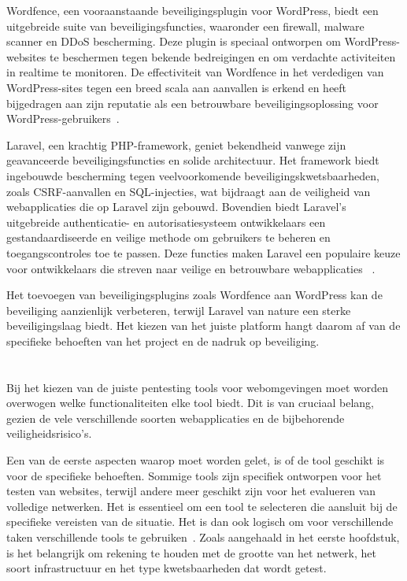 Wordfence, een vooraanstaande beveiligingsplugin voor WordPress, biedt een uitgebreide suite van beveiligingsfuncties, waaronder een 
firewall, malware scanner en DDoS bescherming. Deze plugin is speciaal ontworpen om WordPress-websites te beschermen tegen bekende 
bedreigingen en om verdachte activiteiten in realtime te monitoren. De effectiviteit van Wordfence in het verdedigen van WordPress-sites 
tegen een breed scala aan aanvallen is erkend en heeft bijgedragen aan zijn reputatie als een betrouwbare beveiligingsoplossing voor 
WordPress-gebruikers~\autocite{277144}.

Laravel, een krachtig PHP-framework, geniet bekendheid vanwege zijn geavanceerde beveiligingsfuncties en solide architectuur. Het 
framework biedt ingebouwde bescherming tegen veelvoorkomende beveiligingskwetsbaarheden, zoals CSRF-aanvallen en SQL-injecties, wat 
bijdraagt aan de veiligheid van webapplicaties die op Laravel zijn gebouwd. Bovendien biedt Laravel's uitgebreide authenticatie- en 
autorisatiesysteem ontwikkelaars een gestandaardiseerde en veilige methode om gebruikers te beheren en toegangscontroles toe te passen. 
Deze functies maken Laravel een populaire keuze voor ontwikkelaars die streven naar veilige en betrouwbare webapplicaties
~\autocite{Adamu2020}.

Het toevoegen van beveiligingsplugins zoals Wordfence aan WordPress kan de beveiliging aanzienlijk verbeteren, terwijl Laravel van nature een 
sterke beveiligingslaag biedt. Het kiezen van het juiste platform hangt daarom af van de specifieke behoeften van het project en de nadruk op beveiliging.
\section{}
\label{sec:Webomgevingen}
Bij het kiezen van de juiste pentesting tools voor webomgevingen moet worden overwogen welke functionaliteiten 
elke tool biedt. Dit is van cruciaal belang, gezien de vele verschillende soorten webapplicaties en de bijbehorende veiligheidsrisico's.

Een van de eerste aspecten waarop moet worden gelet, is of de tool geschikt is voor de specifieke behoeften. Sommige tools 
zijn specifiek ontworpen voor het testen van websites, terwijl andere meer geschikt zijn voor het evalueren van volledige 
netwerken. Het is essentieel om een tool te selecteren die aansluit bij de specifieke vereisten van de situatie. Het 
is dan ook logisch om voor verschillende taken verschillende tools te gebruiken~\autocite{Deepikakongara2023}.
Zoals aangehaald in het eerste hoofdstuk, is het belangrijk om rekening te houden met de grootte van het netwerk, 
het soort infrastructuur en het type kwetsbaarheden dat wordt getest.

